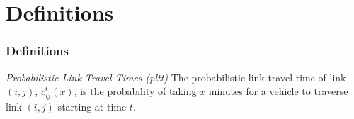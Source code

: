 \documentclass[t]{beamer}
\begin{document}
\section{Definitions}

\begin{frame}\frametitle{Definitions}
\vspace{-0.25in}
\begin{block}{\textit{Probabilistic Link Travel Times \textit{(pltt)}}}
The probabilistic link travel time of link $(i,j)$, $c_{ij}^t(x)$, is the probability of taking $x$ minutes for a vehicle to traverse link $(i,j)$ starting at time $t$.
\end{block}
\end{frame}
\end{document}
